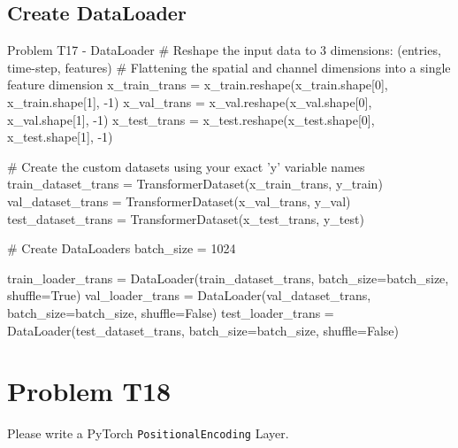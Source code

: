 \documentclass[12pt, a4paper]{article}
\begin{document}
\pagebreak

            \subsection{Create DataLoader}
                \begin{codeblock}{Problem T17 - DataLoader}
                    # Reshape the input data to 3 dimensions: (entries, time-step, features)
                    # Flattening the spatial and channel dimensions into a single feature dimension
                    x_train_trans = x_train.reshape(x_train.shape[0], x_train.shape[1], -1)
                    x_val_trans = x_val.reshape(x_val.shape[0], x_val.shape[1], -1)
                    x_test_trans = x_test.reshape(x_test.shape[0], x_test.shape[1], -1)

                    # Create the custom datasets using your exact 'y' variable names
                    train_dataset_trans = TransformerDataset(x_train_trans, y_train)
                    val_dataset_trans = TransformerDataset(x_val_trans, y_val)
                    test_dataset_trans = TransformerDataset(x_test_trans, y_test)

                    # Create DataLoaders
                    batch_size = 1024

                    train_loader_trans = DataLoader(train_dataset_trans, batch_size=batch_size, shuffle=True)
                    val_loader_trans = DataLoader(val_dataset_trans, batch_size=batch_size, shuffle=False)
                    test_loader_trans = DataLoader(test_dataset_trans, batch_size=batch_size, shuffle=False)
                \end{codeblock}

    \pagebreak

        \section{Problem T18}
            Please write a PyTorch \texttt{PositionalEncoding} Layer.
\end{document}
